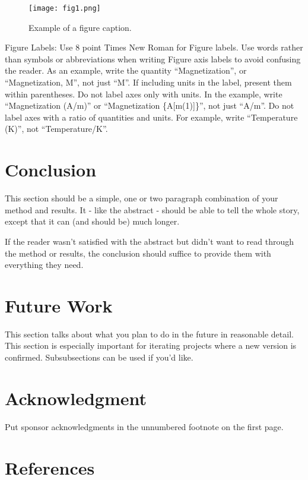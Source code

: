 \documentclass[conference]{IEEEtran}
\begin{document}
\begin{figure}[htbp]
\centerline{\texttt{[image: fig1.png]}}
\caption{Example of a figure caption.}
\label{fig}
\end{figure}

Figure Labels: Use 8 point Times New Roman for Figure labels. Use words 
rather than symbols or abbreviations when writing Figure axis labels to 
avoid confusing the reader. As an example, write the quantity 
``Magnetization'', or ``Magnetization, M'', not just ``M''. If including 
units in the label, present them within parentheses. Do not label axes only 
with units. In the example, write ``Magnetization (A/m)'' or ``Magnetization 
\{A[m(1)]\}'', not just ``A/m''. Do not label axes with a ratio of 
quantities and units. For example, write ``Temperature (K)'', not 
``Temperature/K''.

\section{Conclusion}
This section should be a simple, one or two paragraph combination of your method and results. It - like the abstract - should be able to tell the whole story, except that it can (and should be) much longer. 

If the reader wasn't satisfied with the abstract but didn't want to read through the method or results, the conclusion should suffice to provide them with everything they need.

\section{Future Work}
This section talks about what you plan to do in the future in reasonable detail. This   section is especially important for iterating projects where a new version is confirmed. Subsubsections can be used if you'd like.



\section*{Acknowledgment} %

Put sponsor acknowledgments in the unnumbered footnote on the first page.

\section*{References} %
\end{document}
